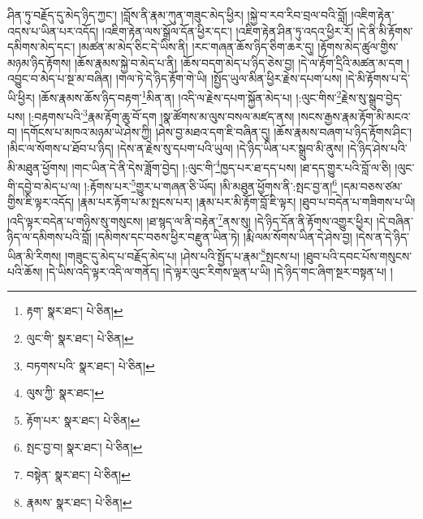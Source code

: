 ཤིན་ཏུ་བརྗོད་དུ་མེད་ཉིད་ཀྱང་། །བློས་ནི་རྣམ་ཀུན་གཟུང་མེད་ཕྱིར། །སྐྱེ་བ་རབ་རིབ་བྲལ་བའི་བློ། །འཇིག་རྟེན་འདས་པ་ཡིན་པར་འདོད། །འཇིག་རྟེན་ལས་སྒྲོལ་དོན་ཕྱིར་དང་། །འཇིག་རྟེན་ཤིན་ཏུ་འདའ་ཕྱིར་རོ། །དེ་ནི་མི་རྟོགས་དམིགས་མེད་དང་། །མཚན་མ་མེད་ཅིང་དེ་ཡིས་ནི། །རང་གཞན་ཆོས་ཉིད་ཅིག་ཆར་དུ། །རྟོགས་མེད་ཚུལ་གྱིས་མཉམ་ཉིད་རྟོགས། །ཆོས་རྣམས་སྐྱེ་བ་མེད་པ་ནི། །ཆོས་བདག་མེད་པ་ཉིད་ཅེས་བྱ། །དེ་ལ་རྟོག་དྲིའི་མཚན་མ་དག །འབྱུང་བ་མེད་པ་སྔ་མ་བཞིན། །གལ་ཏེ་དེ་ཉིད་རྟོག་གེ་ཡི། །སྤྱོད་ཡུལ་མིན་ཕྱིར་རྗེས་དཔག་པས། །དེ་མི་རྟོགས་པ་དེ་ཡི་ཕྱིར། །ཆོས་རྣམས་ཆོས་ཉིད་བརྟག་\footnote{རྟག་  སྣར་ཐང་།  པེ་ཅིན། }མིན་ན། །འདི་ལ་རྗེས་དཔག་སྐྱོན་མེད་པ། །:ལུང་གིས་\footnote{ལུང་གི་  སྣར་ཐང་།  པེ་ཅིན། }རྗེས་སུ་སྒྲུབ་བྱེད་པས། །:བརྟགས་པའི་\footnote{བཏགས་པའི་  སྣར་ཐང་།  པེ་ཅིན། }རྣམ་རྟོག་ཆུ་བོ་དག །སྣ་ཚོགས་མ་ལུས་བསལ་མཛད་ནས། །སངས་རྒྱས་རྣམ་རྟོག་མི་མངའ་བ། །དགོངས་པ་མཁའ་མཉམ་ཡེ་ཤེས་ཀྱི། །ཤེས་བྱ་མཐའ་དག་ཇི་བཞིན་དུ། །ཆོས་རྣམས་བཞག་པ་ཉིད་རྟོགས་ཤིང་། །མིང་ལ་སོགས་པ་ཐོབ་པ་ཉིད། །དེས་ན་རྗེས་སུ་དཔག་པའི་ཡུལ། །དེ་ཉིད་ཡིན་པར་སྒྲུབ་མི་ནུས། །དེ་ཉིད་ཤེས་པའི་མི་མཐུན་ཕྱོགས། །གང་ཡིན་དེ་ནི་དེས་ཟློག་བྱེད། །:ལུང་གི་\footnote{ལུས་ཀྱི་  སྣར་ཐང་། }ཁྱད་པར་ཐ་དད་པས། །ཐ་དད་གྱུར་པའི་བློ་ལ་ཅི། །ལུང་གི་དབྱེ་བ་མེད་པ་ལ། །:རྟོགས་པར་\footnote{རྟོག་པར་  སྣར་ཐང་།  པེ་ཅིན། }གྱུར་པ་གཞན་ཅི་ཡོད། །མི་མཐུན་ཕྱོགས་ནི་:སྤང་བྱ་ན།\footnote{སྤང་བྱ་བ།  སྣར་ཐང་།  པེ་ཅིན། } །དམ་བཅས་ཙམ་གྱིས་ཇི་ལྟར་འདོད། །རྣམ་པར་རྟོག་པ་མ་སྤངས་པར། །རྣམ་པར་མི་རྟོག་བློ་ཇི་ལྟར། །ཐུབ་པ་བདེན་པ་གཟིགས་པ་ཡི། །འདི་ལྟར་བདེན་པ་གཉིས་སུ་གསུངས། །ཐ་སྙད་ལ་ནི་བརྟེན་\footnote{བསྟེན་  སྣར་ཐང་།  པེ་ཅིན། }ནས་སུ། །དེ་ཉིད་དོན་ནི་རྟོགས་འགྱུར་ཕྱིར། །དེ་བཞིན་ཉིད་ལ་དམིགས་པའི་བློ། །དམིགས་དང་བཅས་ཕྱིར་བརྫུན་ཡིན་ཏེ། །རྨི་ལམ་སོགས་ཡིན་དེ་ཤེས་བྱ། །དེས་ན་དེ་ཉིད་ཡིན་མི་རིགས། །གཟུང་དུ་མེད་པ་བརྗོད་མེད་པ། །ཤེས་པའི་སྤྱོད་པ་རྣམ་\footnote{རྣམས་  སྣར་ཐང་།  པེ་ཅིན། }སྤངས་པ། །ཐུབ་པའི་དབང་པོས་གསུངས་པའི་ཆོས། །དེ་ཡིས་འདི་ལྟར་འདི་ལ་གནོད། །དེ་ལྟར་ལུང་རིགས་ལྡན་པ་ཡི། །དེ་ཉིད་གང་ཞིག་སྔར་བསྟན་པ། །
